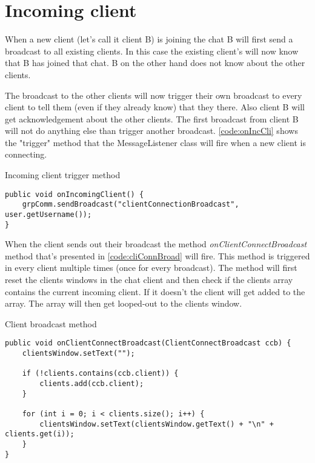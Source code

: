 \section{Incoming client}
When a new client (let's call it client B) is joining the chat B will first send a broadcast to all existing clients. In this case the existing client's will now know that B has joined that chat. B on the other hand does not know about the other clients.

The broadcast to the other clients will now trigger their own broadcast to every client to tell them (even if they already know) that they there. Also client B will get acknowledgement about the other clients. The first broadcast from client B will not do anything else than trigger another broadcast. \cref{code:onIncCli} shows the "trigger" method that the MessageListener class will fire when a new client is connecting. 

\begin{listing}
\caption{Incoming client trigger method}
\label{code:onIncCli}
\begin{verbatim}
public void onIncomingClient() {
    grpComm.sendBroadcast("clientConnectionBroadcast", user.getUsername());
}
\end{verbatim}
\end{listing}


When the client sends out their broadcast the method \textit{onClientConnectBroadcast} method that's presented in \cref{code:cliConnBroad} will fire. This method is triggered in every client multiple times (once for every broadcast). The method will first reset the clients windows in the chat client and then check if the clients array contains the current incoming client. If it doesn't the client will get added to the array. The array will then get looped-out to the clients window.

\begin{listing}[H]
\caption{Client broadcast method}
\label{code:cliConnBroad}
\begin{verbatim}
public void onClientConnectBroadcast(ClientConnectBroadcast ccb) {
    clientsWindow.setText("");

    if (!clients.contains(ccb.client)) {
        clients.add(ccb.client);
    }

    for (int i = 0; i < clients.size(); i++) {
        clientsWindow.setText(clientsWindow.getText() + "\n" + clients.get(i));
    }
}
\end{verbatim}
\end{listing}